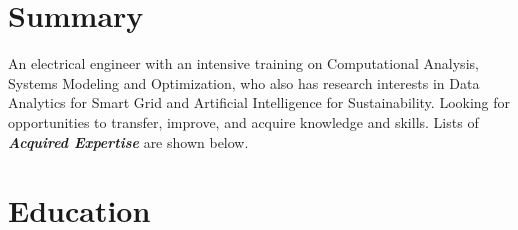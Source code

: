 \documentclass[11pt,letterpaper,sans]{moderncv}
\begin{document}
\vspace{-8ex}
\makecvtitle
\vspace{-8ex}
\section{Summary}
\vspace{-1ex}



An electrical engineer with an intensive training on Computational Analysis, Systems Modeling and Optimization, who also has research interests in Data Analytics for Smart Grid and Artificial Intelligence for Sustainability. Looking for opportunities to transfer, improve, and acquire knowledge and skills.
Lists of \textbf{\emph{Acquired Expertise}} are shown below.


\vspace{-2ex}
\section{Education}
\end{document}
